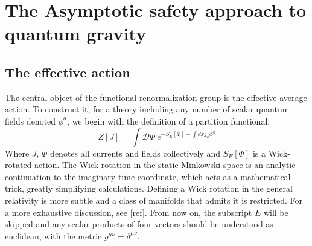 \documentclass[11pt, a4paper]{article}
\newcommand{\jhkbf}[1]{\textbf{\color{red} [#1]}}
\begin{document}

\section{The Asymptotic safety approach to quantum gravity}
\subsection{The effective action}

The central object of the functional renormalization group is the effective average action. To construct it,
for a theory including any number of scalar quantum fields denoted $\phi^a$,
we begin with the definition of a partition functional:
\begin{equation}
    Z[J] = \int \mathcal{D}\Phi \ e^{-S_E[\Phi] - \int d x j_a \phi^a}
    \label{zet}
\end{equation}
Where $J$, $\Phi$ denotes all currents and fields collectively and $S_E[\Phi]$ is a Wick-rotated action.
The Wick rotation in the static Minkowski space is an analytic continuation to the imaginary time coordinate, which acts as a mathematical trick, greatly simplifying calculations. Defining a Wick rotation in the general relativity is more subtle and a class of manifolds that admits it is restricted. For a more exhaustive discussion, see [ref].
From now on, the subscript $E$ will be skipped and any scalar products of four-vectors should be understood as euclidean, with the metric $g^{\mu\nu} = \delta^{\mu\nu}$.
\end{document}
